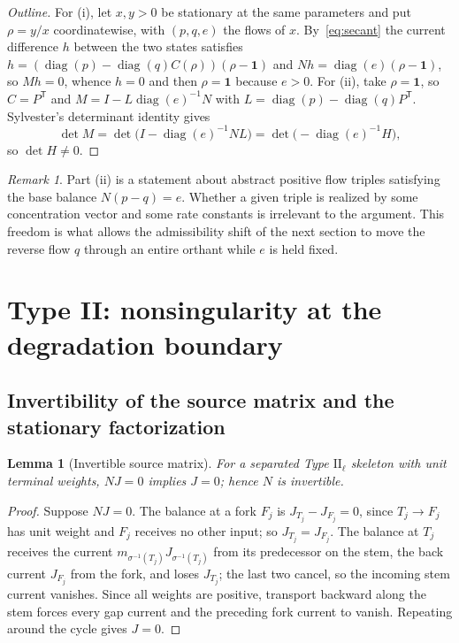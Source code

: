 \documentclass[11pt,a4paper]{article}
\theoremstyle{plain}
\newtheorem{lemma}[theorem]{Lemma}
\theoremstyle{definition}
\theoremstyle{remark}
\newtheorem{remark}[theorem]{Remark}
\numberwithin{equation}{section}
\newcommand{\one}{\mathbf{1}}
\newcommand{\diag}{\operatorname{diag}}
\newcommand{\II}{\mathrm{II}}
\begin{document}
\begin{proof}[Outline]
For (i), let $x,y>0$ be stationary at the same parameters and put $\rho=y/x$ coordinatewise, with $(p,q,e)$ the flows of $x$. By~\eqref{eq:secant} the current difference $h$ between the two states satisfies $h=(\diag(p)-\diag(q)C(\rho))(\rho-\one)$ and $Nh=\diag(e)(\rho-\one)$, so $Mh=0$, whence $h=0$ and then $\rho=\one$ because $e>0$. For (ii), take $\rho=\one$, so $C=P^{\mathsf T}$ and $M=I-L\diag(e)^{-1}N$ with $L=\diag(p)-\diag(q)P^{\mathsf T}$. Sylvester's determinant identity gives
\[
\det M=\det\bigl(I-\diag(e)^{-1}NL\bigr)=\det\bigl(-\diag(e)^{-1}H\bigr),
\]
so $\det H\neq0$.
\end{proof}

\begin{remark}
Part (ii) is a statement about abstract positive flow triples satisfying the base balance $N(p-q)=e$. Whether a given triple is realized by some concentration vector and some rate constants is irrelevant to the argument. This freedom is what allows the admissibility shift of the next section to move the reverse flow $q$ through an entire orthant while $e$ is held fixed.
\end{remark}

\section{Type II: nonsingularity at the degradation boundary}\label{sec:boundary}

\subsection{Invertibility of the source matrix and the stationary factorization}

\begin{lemma}[Invertible source matrix]\label{lem:invertible}
For a separated Type $\II_\ell$ skeleton with unit terminal weights, $NJ=0$ implies $J=0$; hence $N$ is invertible.
\end{lemma}

\begin{proof}
Suppose $NJ=0$. The balance at a fork $F_j$ is $J_{T_j}-J_{F_j}=0$, since $T_j\to F_j$ has unit weight and $F_j$ receives no other input; so $J_{T_j}=J_{F_j}$. The balance at $T_j$ receives the current $m_{\sigma^{-1}(T_j)}J_{\sigma^{-1}(T_j)}$ from its predecessor on the stem, the back current $J_{F_j}$ from the fork, and loses $J_{T_j}$; the last two cancel, so the incoming stem current vanishes. Since all weights are positive, transport backward along the stem forces every gap current and the preceding fork current to vanish. Repeating around the cycle gives $J=0$.
\end{proof}
\end{document}
